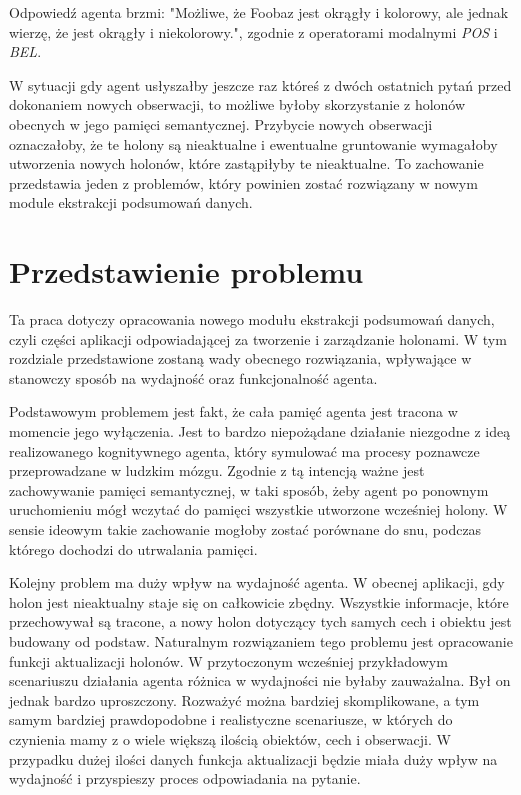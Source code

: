 Odpowiedź agenta brzmi: "Możliwe, że Foobaz jest okrągły i kolorowy, ale jednak wierzę, że jest okrągły i niekolorowy.", zgodnie z operatorami modalnymi \textit{POS} i \textit{BEL}.

W sytuacji gdy agent usłyszałby jeszcze raz któreś z dwóch ostatnich pytań przed dokonaniem nowych obserwacji, to możliwe byłoby skorzystanie z holonów obecnych w jego pamięci semantycznej. Przybycie nowych obserwacji oznaczałoby, że te holony są nieaktualne i ewentualne gruntowanie wymagałoby utworzenia nowych holonów, które zastąpiłyby te nieaktualne. To zachowanie przedstawia jeden z problemów, który powinien zostać rozwiązany w nowym module ekstrakcji podsumowań danych.


\section{Przedstawienie problemu}

Ta praca dotyczy opracowania nowego modułu ekstrakcji podsumowań danych, czyli części aplikacji odpowiadającej za tworzenie i zarządzanie holonami. W tym rozdziale przedstawione zostaną wady obecnego rozwiązania, wpływające w stanowczy sposób na wydajność oraz funkcjonalność agenta.

Podstawowym problemem jest fakt, że cała pamięć agenta jest tracona w momencie jego wyłączenia. Jest to bardzo niepożądane działanie niezgodne z ideą realizowanego kognitywnego agenta, który symulować ma procesy poznawcze przeprowadzane w ludzkim mózgu. Zgodnie z tą intencją ważne jest zachowywanie pamięci semantycznej, w taki sposób, żeby agent po ponownym uruchomieniu mógł wczytać do pamięci wszystkie utworzone wcześniej holony. W sensie ideowym takie zachowanie mogłoby zostać porównane do snu, podczas którego dochodzi do utrwalania pamięci.

Kolejny problem ma duży wpływ na wydajność agenta. W obecnej aplikacji, gdy holon jest nieaktualny staje się on całkowicie zbędny. Wszystkie informacje, które przechowywał są tracone, a nowy holon dotyczący tych samych cech i obiektu jest budowany od podstaw. Naturalnym rozwiązaniem tego problemu jest opracowanie funkcji aktualizacji holonów. W przytoczonym wcześniej przykładowym scenariuszu działania agenta różnica w wydajności nie byłaby zauważalna. Był on jednak bardzo uproszczony. Rozważyć można bardziej skomplikowane, a tym samym bardziej prawdopodobne i realistyczne scenariusze, w których do czynienia mamy z o wiele większą ilością obiektów, cech i obserwacji. W przypadku dużej ilości danych funkcja aktualizacji będzie miała duży wpływ na wydajność i przyspieszy proces odpowiadania na pytanie.

